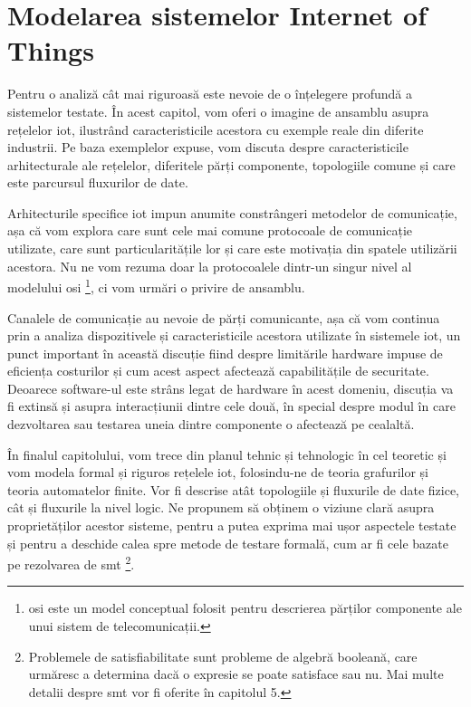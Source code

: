 \chapter{Modelarea sistemelor Internet of Things}

Pentru o analiză cât mai riguroasă este nevoie de o înțelegere profundă a sistemelor testate. În acest capitol, vom oferi o imagine de ansamblu asupra rețelelor \acrshort{iot}, ilustrând caracteristicile acestora cu exemple reale din diferite industrii. Pe baza exemplelor expuse, vom discuta despre caracteristicile arhitecturale ale rețelelor, diferitele părți componente, topologiile comune și care este parcursul fluxurilor de date.

Arhitecturile specifice \acrshort{iot} impun anumite constrângeri metodelor de comunicație, așa că vom explora care sunt cele mai comune protocoale de comunicație utilizate, care sunt particularitățile lor și care este motivația din spatele utilizării acestora. Nu ne vom rezuma doar la protocoalele dintr-un singur nivel al modelului \acrfull{osi} \footnote{\acrshort{osi} este un model conceptual folosit pentru descrierea părților componente ale unui sistem de telecomunicații.}, ci vom urmări o privire de ansamblu.

Canalele de comunicație au nevoie de părți comunicante, așa că vom continua prin a analiza dispozitivele și caracteristicile acestora utilizate în sistemele \acrshort{iot}, un punct important în această discuție fiind despre limitările hardware impuse de eficiența costurilor și cum acest aspect afectează capabilitățile de securitate. Deoarece software-ul este strâns legat de hardware în acest domeniu, discuția va fi extinsă și asupra interacțiunii dintre cele două, în special despre modul în care dezvoltarea sau testarea uneia dintre componente o afectează pe cealaltă.

În finalul capitolului, vom trece din planul tehnic și tehnologic în cel teoretic și vom modela formal și riguros rețelele \acrshort{iot}, folosindu-ne de teoria grafurilor și teoria automatelor finite. Vor fi descrise atât topologiile și fluxurile de date fizice, cât și fluxurile la nivel logic. Ne propunem să obținem o viziune clară asupra proprietăților acestor sisteme, pentru a putea exprima mai ușor aspectele testate și pentru a deschide calea spre metode de testare formală, cum ar fi cele bazate pe rezolvarea de \acrfull{smt} \footnote{Problemele de satisfiabilitate sunt probleme de algebră booleană, care urmăresc a determina dacă o expresie se poate satisface sau nu. Mai multe detalii despre \acrshort{smt} vor fi oferite în capitolul 5.}.

